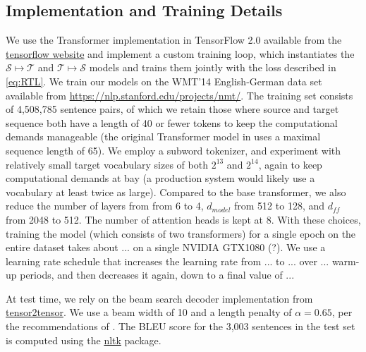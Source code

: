 \documentclass[11pt,a4paper]{article}
\begin{document}
\subsection{Implementation and Training Details}
We use the Transformer implementation in TensorFlow 2.0 available from the \href{https://www.tensorflow.org/tutorials/text/transformer}{tensorflow website} and implement a custom training loop, which instantiates the $\mathcal{S}\mapsto\mathcal{T}$ and $\mathcal{T}\mapsto\mathcal{S}$ models and trains them jointly with the loss described in \eqref{eq:RTL}. We train our models on the WMT'14 English-German data set available from \href{https://nlp.stanford.edu/projects/nmt/}{https://nlp.stanford.edu/projects/nmt/}. The training set consists of 4,508,785 sentence pairs, of which we retain those where source and target sequence both have a length of 40 or fewer tokens to keep the computational demands manageable (the original Transformer model in \citet{transformer} uses a maximal sequence length of 65). We employ a subword tokenizer, and experiment with relatively small target vocabulary sizes of both $2^{13}$ and $2^{14}$, again to keep computational demands at bay (a production system would likely use a vocabulary at least twice as large). Compared to the base transformer, we also reduce the number of layers from from 6 to 4, $d_{model}$ from 512 to 128, and $d_{ff}$ from 2048 to 512. The number of attention heads is kept at 8.
With these choices, training the model (which consists of two transformers) for a single epoch on the entire dataset takes about ... on a single NVIDIA GTX1080 (?). We use a learning rate schedule that increases the learning rate from ... to ... over ... warm-up periods, and then decreases it again, down to a final value of ... 

At test time, we rely on the beam search decoder implementation from \href{https://github.com/tensorflow/tensor2tensor/blob/master/tensor2tensor/utils}{tensor2tensor}. We use a beam width of 10 and a length penalty of $\alpha=0.65$, per the recommendations of \citet{googlenmt}. The BLEU score for the 3,003 sentences in the test set is computed using the \href{https://www.nltk.org/}{nltk} package. 
\end{document}
